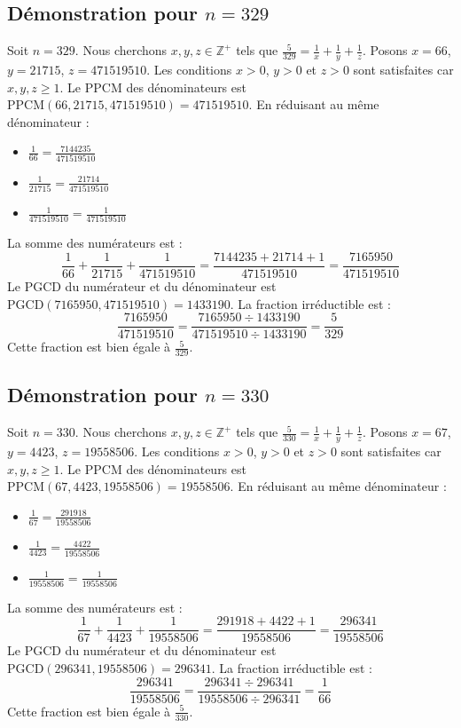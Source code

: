\documentclass[11pt,a4paper]{article}
\begin{document}
\subsection{Démonstration pour $n = 329$}
Soit $n = 329$. Nous cherchons $x, y, z \in \mathbb{Z}^{+}$ tels que $\frac{5}{329} = \frac{1}{x} + \frac{1}{y} + \frac{1}{z}$.
Posons $x = 66$, $y = 21715$, $z = 471519510$.
Les conditions $x > 0$, $y > 0$ et $z > 0$ sont satisfaites car $x, y, z \geq 1$.
Le PPCM des dénominateurs est $\text{PPCM}(66, 21715, 471519510) = 471519510$.
En réduisant au même dénominateur :
\begin{itemize}
    \item $\frac{1}{66} = \frac{7144235}{471519510}$
    \item $\frac{1}{21715} = \frac{21714}{471519510}$
    \item $\frac{1}{471519510} = \frac{1}{471519510}$
\end{itemize}
La somme des numérateurs est :
$$ \frac{1}{66} + \frac{1}{21715} + \frac{1}{471519510} = \frac{7144235 + 21714 + 1}{471519510} = \frac{7165950}{471519510} $$
Le PGCD du numérateur et du dénominateur est $\text{PGCD}(7165950, 471519510) = 1433190$.
La fraction irréductible est :
$$ \frac{7165950}{471519510} = \frac{7165950 \div 1433190}{471519510 \div 1433190} = \frac{5}{329} $$
Cette fraction est bien égale à $\frac{5}{329}$.

\subsection{Démonstration pour $n = 330$}
Soit $n = 330$. Nous cherchons $x, y, z \in \mathbb{Z}^{+}$ tels que $\frac{5}{330} = \frac{1}{x} + \frac{1}{y} + \frac{1}{z}$.
Posons $x = 67$, $y = 4423$, $z = 19558506$.
Les conditions $x > 0$, $y > 0$ et $z > 0$ sont satisfaites car $x, y, z \geq 1$.
Le PPCM des dénominateurs est $\text{PPCM}(67, 4423, 19558506) = 19558506$.
En réduisant au même dénominateur :
\begin{itemize}
    \item $\frac{1}{67} = \frac{291918}{19558506}$
    \item $\frac{1}{4423} = \frac{4422}{19558506}$
    \item $\frac{1}{19558506} = \frac{1}{19558506}$
\end{itemize}
La somme des numérateurs est :
$$ \frac{1}{67} + \frac{1}{4423} + \frac{1}{19558506} = \frac{291918 + 4422 + 1}{19558506} = \frac{296341}{19558506} $$
Le PGCD du numérateur et du dénominateur est $\text{PGCD}(296341, 19558506) = 296341$.
La fraction irréductible est :
$$ \frac{296341}{19558506} = \frac{296341 \div 296341}{19558506 \div 296341} = \frac{1}{66} $$
Cette fraction est bien égale à $\frac{5}{330}$.
\end{document}
